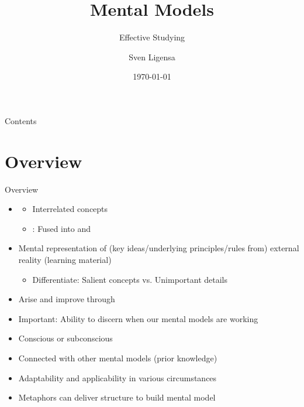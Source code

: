 \documentclass{ercisbeamer}
\title{Mental Models}
\subtitle{Effective Studying}
\author{Sven Ligensa}
\institute{European Research Center for Information Systems (ERCIS)}
\date{\today}
\begin{document}
\begin{frame}
    \begin{tbox}
        \titlepage
    \end{tbox}
\end{frame}
\setbgimage{}

\begin{frame}{Contents}
    \tableofcontents
\end{frame}

\section{Overview}
\begin{frame}{Overview}
    \begin{tbox}
        \begin{itemize}
            \item {}
            \begin{itemize}
                \item Interrelated concepts 
                \item {}: Fused into  and 
            \end{itemize}
            \item Mental representation of (key ideas/underlying principles/rules from) external reality (learning material)
            \begin{itemize}
                \item Differentiate: Salient concepts vs. Unimportant details
            \end{itemize}
            \item Arise and improve through 
            \item Important: Ability to discern when our mental models are  working
            \item Conscious or subconscious
            \item Connected with other mental models (prior knowledge)
            \item Adaptability and applicability in various circumstances
            \item Metaphors can deliver structure to build mental model
        \end{itemize}
    \end{tbox}
\end{frame}
\end{document}
